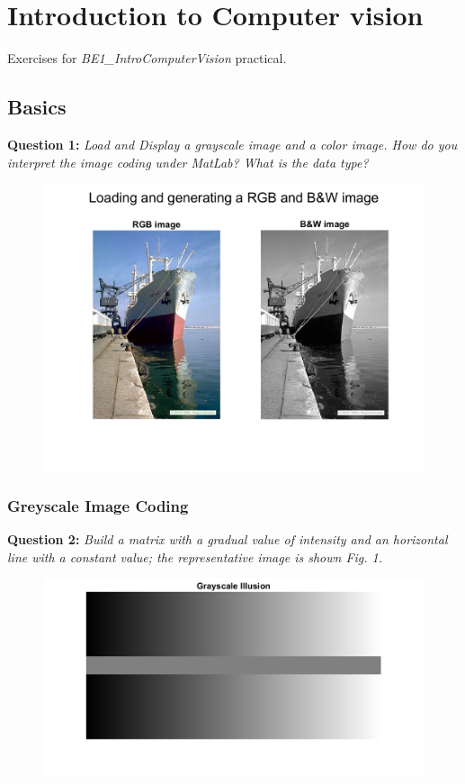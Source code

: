 \section{Introduction to Computer vision}
\label{sec:introduction_to_computer_vision}

Exercises for \textit{BE1\_IntroComputerVision} practical.

\subsection{Basics}

\textbf{Question 1:}
\textit{Load and Display a grayscale image and a color image. How do you interpret the image coding under MatLab? What is the data type?}

\begin{figure}[H]
    \centering
    \includegraphics[width=0.5\linewidth]{Doc/Graphics/Part1_Question1.png}
    \label{fig:enter-label}
\end{figure}


\subsubsection{Greyscale Image Coding}

\textbf{Question 2:}
\textit{Build a matrix with a gradual value of intensity and an horizontal line with a constant value; the representative image is shown Fig. 1.}

\begin{figure}[H]
    \centering
    \includegraphics[width=0.5\linewidth]{Doc/Graphics/Part1_Question2.png}
    \label{fig:enter-label}
\end{figure}




